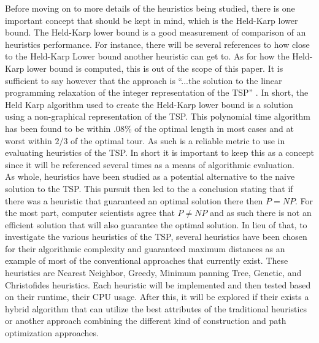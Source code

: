 \documentclass[midd]{thesis}
\newcommand{\tab}{\hspace*{2em}}
\begin{document}
\tab Before moving on to more details of the heuristics being studied, there is one important concept that should be kept in mind, which is the Held-Karp lower bound. The Held-Karp lower bound is a good measurement of comparison of an heuristics performance. For instance, there will be several references to how close to the Held-Karp Lower bound another heuristic can get to. As for how the Held-Karp lower bound is computed, this is out of the scope of this paper. It is sufficient to say however that the approach is ``...the solution to the linear programming relaxation of the integer representation of the TSP'' \cite{htspc}. In short, the Held Karp algorithm used to create the Held-Karp lower bound is a solution using a non-graphical representation of the TSP. This polynomial time algorithm has been found to be within .08\% of  the optimal length in most cases and at worst within $2/3$ of the optimal tour. As such is a reliable metric to use in evaluating heuristics of the TSP. In short it is important to keep this as a concept since it will be referenced several times as a means of algorithmic evaluation.\\
\tab As whole, heuristics have been studied as a potential alternative to the naive solution to the TSP. This pursuit then led to the a conclusion stating that if there was a heuristic that guaranteed an optimal solution there then $P = NP$. For the most  part, computer scientists agree that $P \neq NP$ and as such there is not an efficient solution that will also guarantee the optimal solution. In lieu of that, to investigate the various heuristics of the TSP, several heuristics have been chosen for their algorithmic complexity and guaranteed maximum distances as an example of most of the conventional approaches that currently exist. These heuristics are Nearest Neighbor, Greedy, Minimum panning Tree, Genetic, and Christofides heuristics. Each heuristic will be implemented and then tested based on their runtime, their CPU usage. After this, it will be explored if their exists a hybrid algorithm that can utilize the best attributes of the traditional heuristics or another approach combining the different kind of construction and path optimization approaches.\\
\end{document}
